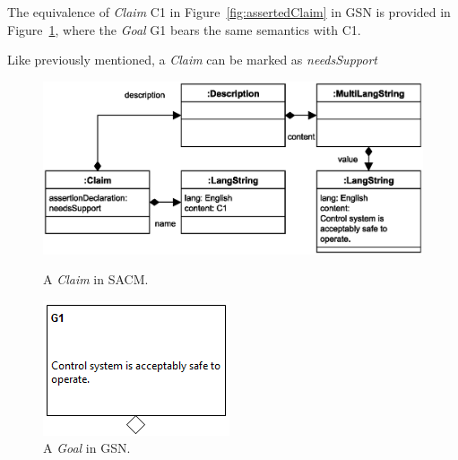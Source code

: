 The equivalence of \textit{Claim} C1 in Figure~\ref{fig:assertedClaim} in GSN is provided in Figure~\ref{fig:goalingsn}, where the \textit{Goal} G1 bears the same semantics with C1.

Like previously mentioned, a \textit{Claim} can be marked as \textit{needsSupport}
\begin{figure}
	\centering
	\begin{minipage}[b]{0.7\textwidth}
		\includegraphics[width=\textwidth]{fig/needsSupportClaim.eps}
		\caption{A \textit{Claim} in SACM.}
		\label{fig:assertedClaim}
	\end{minipage}
	\hfill
	\begin{minipage}[b]{0.28\textwidth}
		\includegraphics[width=\textwidth]{fig/undevGoal.png}
		\caption{A \textit{Goal} in GSN.}
		\label{fig:goalingsn}
	\end{minipage}
\end{figure}